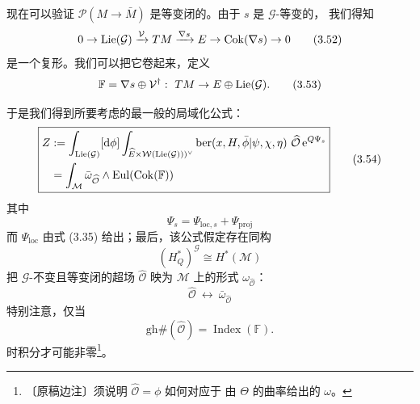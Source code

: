 现在可以验证 $\mathcal P(M\to\bar M)$ 是等变闭的。由于 $s$ 是 $\mathcal G$-等变的，
我们得知
\begin{equation}
0\to\operatorname{Lie}(\mathcal G)\xrightarrow{\mathcal V}TM\xrightarrow{\nabla s}E
\to\operatorname{Cok}(\nabla s)\to 0
\tag{3.52}
\end{equation}
是一个复形。我们可以把它卷起来，定义
\begin{equation}
\mathbb F = \nabla s\oplus\mathcal V^{\dagger}:\ TM\to E\oplus\Lie(\mathcal G).
\tag{3.53}
\end{equation}

于是我们得到所要考虑的最一般的局域化公式：
\begin{equation}
\boxed{
\begin{aligned}
Z &:= \int_{\operatorname{Lie}(\mathcal G)}[\mathrm{d}\phi]
\int_{\widehat E\times\mathcal W(\operatorname{Lie}(\mathcal G)))^{\vee}}
\mathrm{ber}(x,H,\bar\phi|\psi,\chi,\eta)\ \widehat{\mathcal O}\,
\mathrm{e}^{Q\Psi_s}\\
&= \int_{\mathcal M}\bar\omega_{\widehat{\mathcal O}}
\wedge\mathrm{Eul}(\operatorname{Cok}(\mathbb F))
\end{aligned}}
\tag{3.54}
\end{equation}
其中
\begin{equation}
\Psi_s = \Psi_{\mathrm{loc},s}+\Psi_{\mathrm{proj}}
\tag{3.55}
\end{equation}
而 $\Psi_{\mathrm{loc}}$ 由式 (3.35) 给出；最后，该公式假定存在同构
\begin{equation}
(H^{\ast}_Q)^{\mathcal G}\cong H^{\ast}(\mathcal M)
\tag{3.56}
\end{equation}
把 $\mathcal G$-不变且等变闭的超场 $\widehat{\mathcal O}$ 映为 $\mathcal M$ 上的形式
$\omega_{\widehat{\mathcal O}}$：
\begin{equation}
\widehat{\mathcal O}\ \leftrightarrow\ \bar\omega_{\widehat{\mathcal O}}
\tag{3.57}
\end{equation}
特别注意，仅当
\begin{equation}
\mathrm{gh}\#(\widehat{\mathcal O}) = \operatorname{Index}(\mathbb F).
\tag{3.58}
\end{equation}
时积分才可能非零\footnote{〔原稿边注〕须说明 $\widehat{\mathcal O}=\phi$ 如何对应于
由 $\Theta$ 的曲率给出的 $\omega$。}。

